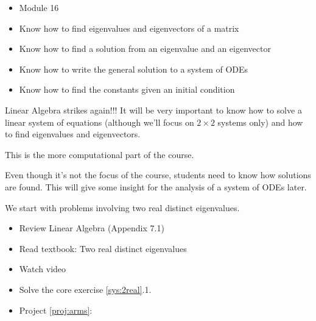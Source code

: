 \begin{lesson}

	\begin{itemize}
		\item Module 16
	\end{itemize}

	\begin{itemize}
		\item Know how to find eigenvalues and eigenvectors of a matrix
		\item Know how to find a solution from an eigenvalue and an eigenvector
		\item Know how to write the general solution to a system of ODEs
		\item Know how to find the constants given an initial condition
	\end{itemize}
	

Linear Algebra strikes again!!! It will be very important to know how to solve a linear system of equations (although we'll focus on $2\times 2$ systems only) and how to find eigenvalues and eigenvectors. 

This is the more computational part of the course. 

Even though it's not the focus of the course, students need to know how solutions are found. This will give some insight for the analysis of a system of ODEs later. 

We start with problems involving two real distinct eigenvalues.

\begin{itemize}
	\item Review Linear Algebra (Appendix 7.1)
	\item Read textbook: Two real distinct eigenvalues
	\item Watch video
	\item Solve the core exercise \ref{sys:2real}.1.
\end{itemize}


\begin{itemize}
	\item Project \ref{proj:arms}: \armstitle
\end{itemize}


\end{lesson}




